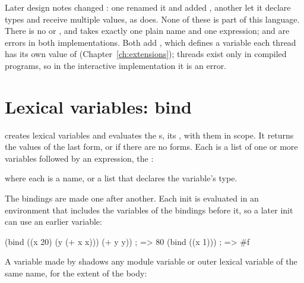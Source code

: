 \begin{notebox}
Later design notes changed : one renamed it
 and added , another let it
declare types and receive multiple values, as  does. None of
these is part of this language. There is no  or
, and  takes exactly one plain name and
one expression;  and  are errors in both implementations. Both add
, which defines a variable each thread has its
own value of (Chapter~\ref{ch:extensions}); threads exist only in compiled
programs, so in the interactive implementation it is an error.
\end{notebox}

\section{Lexical variables: bind}\label{sec:control-bind}

\begin{quote}
\end{quote}

\noindent {} creates lexical variables and evaluates the
s, its , with them in scope. It returns the values of
the last form, or  if there are no forms. Each  is
a list of one or more variables followed by an expression, the
:

\begin{quote}
\end{quote}

\noindent where each  is a name, or a list  that declares the variable's type.

The bindings are made one after another. Each init is evaluated in an
environment that includes the variables of the bindings before it, so a
later init can use an earlier variable:

\begin{dylan}
(bind ((x 20)
       (y (+ x x)))
  (+ y y))                ; => 80
(bind ((x 1)))            ; => #f
\end{dylan}

\noindent A variable made by  shadows any module variable or
outer lexical variable of the same name, for the extent of the body:

